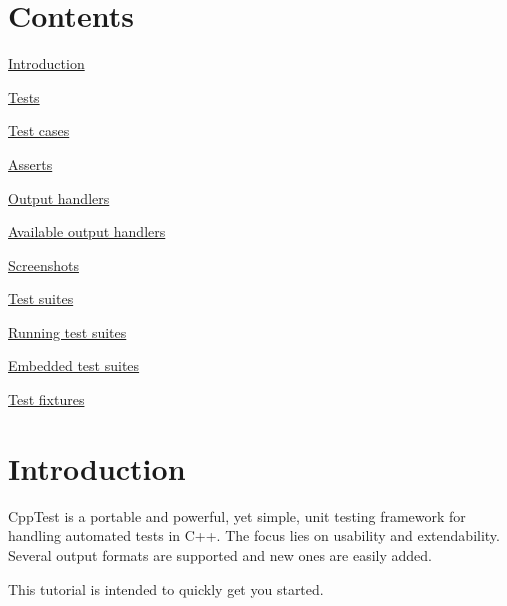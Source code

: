 \hypertarget{tutorial_Contents}{}\section{Contents}\label{tutorial_Contents}

\begin{DoxyItemize}
\item \hyperlink{tutorial_tutorial_introduction}{Introduction}
\item \hyperlink{tutorial_tutorial_tests}{Tests}
\begin{DoxyItemize}
\item \hyperlink{tutorial_tutorial_test_cases}{Test cases}
\item \hyperlink{tutorial_tutorial_asserts}{Asserts}
\end{DoxyItemize}
\item \hyperlink{tutorial_tutorial_output_handlers}{Output handlers}
\begin{DoxyItemize}
\item \hyperlink{tutorial_tutorial_available_output_handlers}{Available output handlers}
\item \hyperlink{tutorial_tutorial_screenshots}{Screenshots}
\end{DoxyItemize}
\item \hyperlink{tutorial_tutorial_test_suites}{Test suites}
\begin{DoxyItemize}
\item \hyperlink{tutorial_tutorial_running_test_suites}{Running test suites}
\item \hyperlink{tutorial_tutorial_embedded_test_suites}{Embedded test suites}
\item \hyperlink{tutorial_tutorial_test_fixtures}{Test fixtures}
\end{DoxyItemize}
\end{DoxyItemize}\hypertarget{tutorial_tutorial_introduction}{}\section{Introduction}\label{tutorial_tutorial_introduction}
Cpp\+Test is a portable and powerful, yet simple, unit testing framework for handling automated tests in C++. The focus lies on usability and extendability. Several output formats are supported and new ones are easily added.

This tutorial is intended to quickly get you started.

